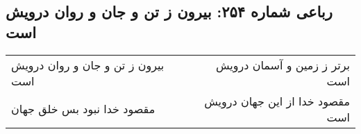 \begin{center}
\section*{رباعی شماره ۲۵۴: بیرون ز تن و جان و روان درویش است}
\label{sec:0254}
\begin{longtable}{l p{0.5cm} r}
بیرون ز تن و جان و روان درویش است
&&
برتر ز زمین و آسمان درویش است
\\
مقصود خدا نبود بس خلق جهان
&&
مقصود خدا از این جهان درویش است
\\
\end{longtable}
\end{center}
